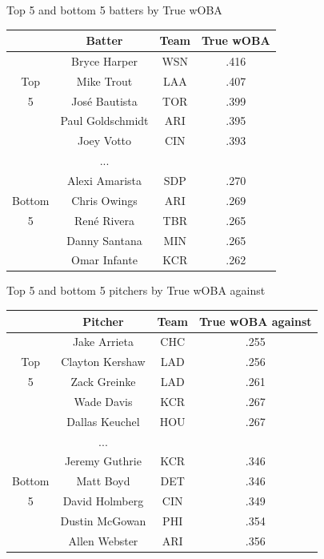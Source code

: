 \documentclass{beamer}
\begin{document}
\begin{frame}{Top 5 and bottom 5 batters by True wOBA}
\centering
\scriptsize
\hspace*{-1cm}
\begin{tabular}{c|ccc}
      &Batter        &Team& True wOBA \\
\hline
      &Bryce Harper     &WSN & .416 \\
Top   &Mike Trout       &LAA & .407 \\
5     &Jos\'{e} Bautista&TOR & .399 \\
      &Paul Goldschmidt &ARI & .395 \\
      &Joey Votto       &CIN & .393 \\
      &...              &    &      \\*
      &Alexi Amarista   &SDP & .270 \\
Bottom&Chris Owings     &ARI & .269 \\
5     &Ren\'{e} Rivera  &TBR & .265 \\
      &Danny Santana    &MIN & .265 \\
      &Omar Infante     &KCR & .262 
\end{tabular}
\end{frame}

\begin{frame}{Top 5 and bottom 5 pitchers by True wOBA against}
\centering
\scriptsize
\hspace*{-1cm}
\begin{tabular}{c|ccc}
      & Pitcher    &Team& True wOBA against\\
\hline
      &Jake Arrieta   &CHC & .255 \\
Top   &Clayton Kershaw&LAD & .256 \\
5     &Zack Greinke   &LAD & .261 \\
      &Wade Davis     &KCR & .267 \\
      &Dallas Keuchel &HOU & .267 \\
      &...            &    &      \\
      &Jeremy Guthrie &KCR & .346 \\
Bottom&Matt Boyd      &DET & .346 \\
5     &David Holmberg &CIN & .349 \\
      &Dustin McGowan &PHI & .354 \\
      &Allen Webster  &ARI & .356
\end{tabular}
\end{frame}
\end{document}
